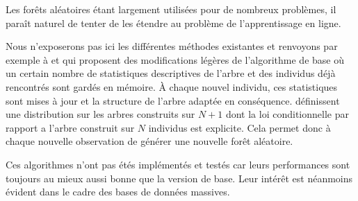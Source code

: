 Les forêts aléatoires étant largement utilisées pour de nombreux problèmes, il paraît naturel de tenter de les étendre au problème de l'apprentissage en ligne.

Nous n'exposerons pas ici les différentes méthodes existantes et renvoyons par exemple à \citet{Saffari2009} et \citet{Denil2013} qui proposent des modifications légères de l'algorithme de base où un certain nombre de statistiques descriptives de l'arbre et des individus déjà rencontrés sont gardés en mémoire. À chaque nouvel individu, ces statistiques sont mises à jour et la structure de l'arbre adaptée en conséquence. \citet{Lakshminarayanan2014} définissent une distribution sur les arbres construits sur $N+1$ dont la loi conditionnelle par rapport a l'arbre construit sur $N$ individus est explicite. Cela permet donc à chaque nouvelle observation de générer une nouvelle forêt aléatoire.

Ces algorithmes n'ont pas étés implémentés et testés car leurs performances sont toujours au mieux aussi bonne que la version de base. Leur intérêt est néanmoins évident dans le cadre des bases de données massives.